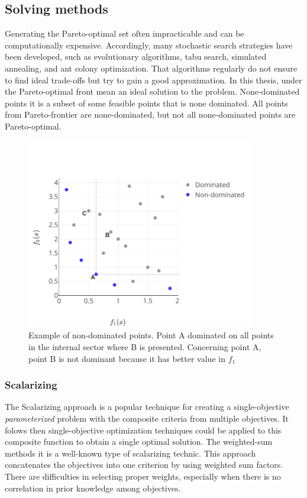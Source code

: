         \subsection{Solving methods}
            Generating the Pareto-optimal set often impracticable and can be computationally expensive. Accordingly, many stochastic search strategies have been developed, such as evolutionary algorithms, tabu search, simulated annealing, and ant colony optimization. That algorithms regularly do not ensure to find ideal trade-offs but try to gain a good approximation.
            In this thesis, under the Pareto-optimal front mean an ideal solution to the problem. None-dominated points it is a subset of some feasible points that is none dominated. All points from Pareto-frontier are none-dominated, but not all none-dominated points are Pareto-optimal.

                \begin{figure}
                    \centering 
                    \includegraphics[width=10cm]{content/images/ndom}
                    \caption[Non-dominated points]{Example of non-dominated points. Point A dominated on all points in the internal sector where B is presented. Concerning point A, point B is not dominant because it has better value in $f_1$} 
                    \label{fig:dominated} 
                \end{figure}
        
            \subsubsection{Scalarizing}
                The Scalarizing approach is a popular technique for creating a single-objective \textit{parameterized} problem with the composite criteria from multiple objectives. It folows then single-objective optimization techniques could be applied to this composite function to obtain a single optimal solution. The weighted-sum methods it is a well-known type of scalarizing technic. This approach concatenates the objectives into one criterion by using weighted sum factors. There are difficulties in selecting proper weights, especially when there is no correlation in prior knowledge among objectives.  

